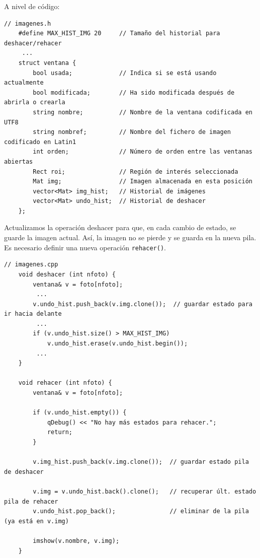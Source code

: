 \documentclass[11pt]{article}
\begin{document}
          \noindent
          A nivel de código:

          \begin{lstlisting}[style=CppQtStyle, caption={Definición de \texttt{struct ventana} en \texttt{imagenes.h}.}]
    // imagenes.h
    #define MAX_HIST_IMG 20     // Tamaño del historial para deshacer/rehacer
     ...
    struct ventana {
        bool usada;             // Indica si se está usando actualmente
        bool modificada;        // Ha sido modificada después de abrirla o crearla
        string nombre;          // Nombre de la ventana codificada en UTF8
        string nombref;         // Nombre del fichero de imagen codificado en Latin1
        int orden;              // Número de orden entre las ventanas abiertas
        Rect roi;               // Región de interés seleccionada
        Mat img;                // Imagen almacenada en esta posición
        vector<Mat> img_hist;   // Historial de imágenes
        vector<Mat> undo_hist;  // Historial de deshacer
    };
\end{lstlisting}

          \clearpage

          \noindent
          Actualizamos la operación deshacer para que, en cada cambio de estado, se guarde la imagen actual. Así, la imagen no se pierde y se guarda en la nueva pila. Es necesario definir una nueva operación \texttt{rehacer()}.

          \begin{lstlisting}[style=CppQtStyle, caption={Implementación de \texttt{deshacer()} y \texttt{rehacer()} en \texttt{imagenes.cpp}.}]
    // imagenes.cpp
    void deshacer (int nfoto) {
        ventana& v = foto[nfoto];
         ...
        v.undo_hist.push_back(v.img.clone());  // guardar estado para ir hacia delante
         ...
        if (v.undo_hist.size() > MAX_HIST_IMG)
            v.undo_hist.erase(v.undo_hist.begin());
         ...
    }

    void rehacer (int nfoto) {
        ventana& v = foto[nfoto];

        if (v.undo_hist.empty()) {
            qDebug() << "No hay más estados para rehacer.";
            return;
        }

        v.img_hist.push_back(v.img.clone());  // guardar estado pila de deshacer

        v.img = v.undo_hist.back().clone();   // recuperar últ. estado pila de rehacer
        v.undo_hist.pop_back();               // eliminar de la pila (ya está en v.img)

        imshow(v.nombre, v.img);
    }
\end{lstlisting}
\end{document}
